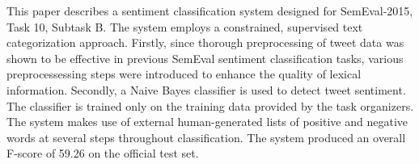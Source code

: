 This paper describes a sentiment classification system designed for SemEval-2015, Task 10, Subtask B. The system employs a constrained, supervised text categorization approach. Firstly, since thorough preprocessing of tweet data was shown to be effective in previous SemEval sentiment classification tasks, various preprocessessing steps were introduced to enhance the quality of lexical information. Secondly, a Naive Bayes classifier is used to detect tweet sentiment.  The classifier is trained only on the training data provided by the task organizers. The system makes use of external human-generated lists of positive and negative words at several steps throughout classification. The system produced an overall F-score of 59.26 on the official test set.
